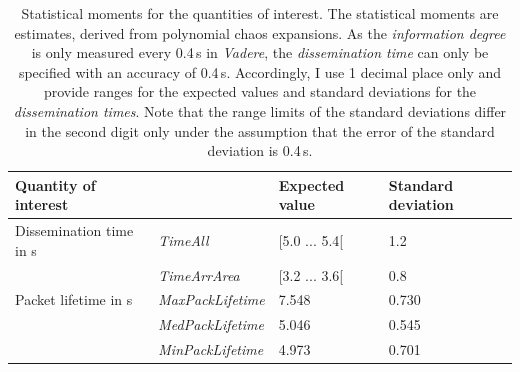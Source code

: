 
\begin{table}[hbt!]
\centering
\begin{footnotesize}


    \centering
    \begin{tabular}{p{3.3cm}p{2.5cm}p{2.3cm}p{2.8cm}}
    \hline
        Quantity of interest & ~ & Expected value & Standard deviation \\ \hline
       Dissemination time in s & \textit{TimeAll} & [5.0 ... 5.4[ & 1.2 %
       \\
        ~ & \textit{TimeArrArea} & [3.2 ... 3.6[ & 0.8 %
        \\ 
         Packet lifetime in s & \textit{MaxPackLifetime} & 7.548 & 0.730 \\ 
        ~ & \textit{MedPackLifetime} & 5.046 & 0.545 \\ 
        ~ & \textit{MinPackLifetime} & 4.973 & 0.701   \\ \hline
    \end{tabular}
    \end{footnotesize}
    \caption[Statistical moments for the quantities of interest]{Statistical moments for the quantities of interest. The statistical moments are estimates, derived from polynomial chaos expansions. 
    As the \textit{information degree} is only measured every 0.4\,s in \textit{Vadere}, the \textit{dissemination time} can only be specified with an accuracy of 0.4\,s. Accordingly, I use 1 decimal place only and provide  ranges for the expected values and standard deviations for the \textit{dissemination times}. Note that the range limits of the standard deviations differ in the second digit only under the assumption that the error of the standard deviation is 0.4\,s. }
\label{tab:qoimoments}
\end{table}




